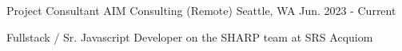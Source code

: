 

\begin{cventries}

\cventry
  {Project Consultant} %
  {AIM Consulting (Remote)} %
  {Seattle, WA} %
  {Jun. 2023 - Current} %
  {
    \begin{cvitems} %
      \item[] {Fullstack / Sr. Javascript Developer on the SHARP team at SRS Acquiom}
    \end{cvitems}
  }


\end{cventries}

